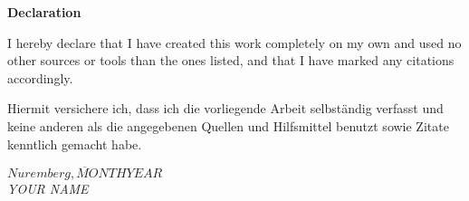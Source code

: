 \thispagestyle{plain}
\begin{center}
	
	\LARGE
	\textbf{Declaration}
	
\end{center}
\vfill
I hereby declare that I have created this work completely on my own and used no other sources or tools than the ones listed, and that I have marked any citations accordingly.

Hiermit versichere ich, dass ich die vorliegende Arbeit selbst\"andig verfasst und keine anderen als die angegebenen Quellen und Hilfsmittel benutzt sowie Zitate kenntlich gemacht habe. 

\begin{flushright}
\vspace{12mm}
$\overline{Nuremberg, MONTH \mathit{YEAR}}$\\
\textit{YOUR NAME}
\end{flushright}

